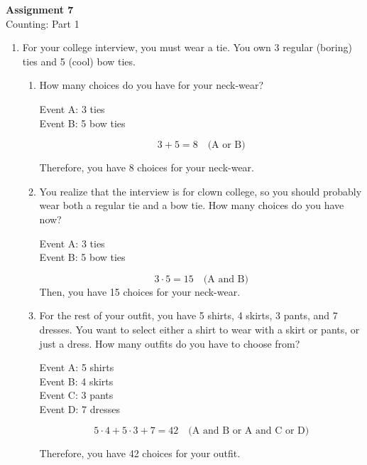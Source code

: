 \documentclass[11pt, letterpaper, includehead]{article}
\theoremstyle{plain}
\theoremstyle{mydefinition}
\theoremstyle{myproperty}
\begin{document}
 

\pagestyle{fancy}
\fancyhead{}
\fancyfoot{}


\begin{center}
    \Large{\textbf{Assignment 7}}\\
    \Large{Counting: Part 1}
\end{center}

\begin{enumerate}[label=\textbf{\arabic*}., leftmargin=*]
\item For your college interview, you must wear a tie. You own 3 regular (boring) ties and 5 (cool) bow ties.
\begin{enumerate}[label=(\alph*)]
    \item How many choices do you have for your neck-wear?

    Event A: 3 ties \\
    Event B: 5 bow ties

    \[
    3 + 5 = 8 \quad \text{(A or B)}
    \]

    Therefore, you have 8 choices for your neck-wear.

    \item You realize that the interview is for clown college, so you should probably wear both a regular tie and a bow tie. How many choices do you have now?
    
    Event A: 3 ties \\
    Event B: 5 bow ties

    \[
    3 \cdot 5 = 15 \quad \text{(A and B)}
    \]
    Then, you have 15 choices for your neck-wear.
    \item For the rest of your outfit, you have 5 shirts, 4 skirts, 3 pants, and 7 dresses. You want to select either a shirt to wear with a skirt or pants, or just a dress. How many outfits do you have to choose from?

    Event A: 5 shirts \\
    Event B: 4 skirts \\
    Event C: 3 pants \\
    Event D: 7 dresses

    \[
    5 \cdot 4 + 5 \cdot 3 + 7 =  42\quad \text{(A and B or A and C or D)}
    \]

    Therefore, you have 42 choices for your outfit.
\end{enumerate}


\end{enumerate}
\end{document}
